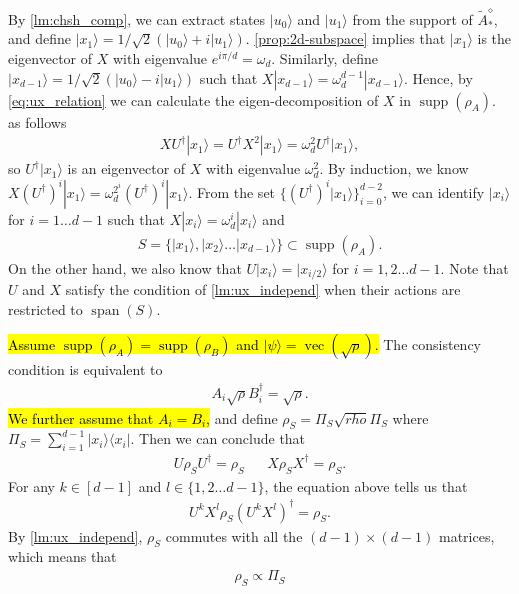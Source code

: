 \documentclass[11pt,letterpaper]{article}
\newcommand{\ket}[1]{|#1\rangle}
\newcommand{\ketbra}[2]{|#1\rangle\langle#2|}
\DeclareMathOperator{\vc}{vec}
\DeclareMathOperator{\spn}{span}
\DeclareMathOperator{\supp}{supp}
\newcommand{\1}{\mathbb{1}}
\newcommand{\tA}{\tilde{A}}
\theoremstyle{definition}
\begin{document}
By \cref{lm:chsh_comp}, we can extract states $\ket{u_0}$ and $\ket{u_1}$ from the support of $\tA_\ast^\diamond$,   
and define $\ket{x_1} = 1/\sqrt{2}(\ket{u_0} + i\ket{u_1})$. 
\cref{prop:2d-subspace} implies that $\ket{x_1}$ is the eigenvector of $X$ with eigenvalue $e^{i\pi/d} = \omega_d$.
Similarly, define $\ket{x_{d-1}} = 1/\sqrt{2}(\ket{u_0} - i\ket{u_1})$ such that $X \ket{x_{d-1}} = \omega_d^{d-1}\ket{x_{d-1}}$.
Hence, by \cref{eq:ux_relation} we can calculate the eigen-decomposition of $X$ in $\supp(\rho_A)$.
as follows
\begin{align}
\label{eq:ladder}
 XU^\dagger \ket{x_1} = U^\dagger X^2 \ket{x_1} = \omega_d^2 U^\dagger \ket{x_1},
\end{align}
so $U^\dagger \ket{x_1}$ is an eigenvector of $X$ with eigenvalue $\omega_d^2$.
By induction, we know $X (U^\dagger)^i \ket{x_1} = \omega_d^{2^i} (U^\dagger)^i\ket{x_1}$. 
From the set $\{(U^\dagger)^i \ket{x_1}\}_{i=0}^{d-2}$, we can identify $\ket{x_i}$ for $i = 1 \dots  d-1$
such that $X \ket{x_i} = \omega_d^i \ket{x_i}$ and 
\begin{align}
S = \{ \ket{x_1}, \ket{x_2} \dots  \ket{x_{d-1}} \} \subset \supp(\rho_A).
\end{align}
On the other hand, we also know that $U \ket{x_i} = \ket{x_{i/2}}$ for $i = 1,2 \dots d-1$.
Note that $U$ and $X$ satisfy the condition of \cref{lm:ux_independ} when their actions are 
restricted to $\spn(S)$.

\hl{Assume $\supp(\rho_A) = \supp(\rho_B)$ and $\ket{\psi} = \vc(\sqrt{\rho})$.} 
The consistency condition is equivalent to
\begin{align}
	A_i \sqrt{\rho} B_i^\dagger = \sqrt{\rho}.
\end{align}
\hl{We further assume that $A_i = B_i$,} and define $\rho_S = \Pi_S \sqrt{rho} \Pi_S$
where $\Pi_S = \sum_{i=1}^{d-1} \ketbra{x_i}{x_i}$. 
Then we can conclude that 
\begin{align}
	U \rho_S U^{\dagger} = \rho_S && X \rho_S X^\dagger = \rho_S.
\end{align}
For any $k \in [d-1]$ and $l \in \{1,2\dots d-1\}$, the equation above tells us that 
\begin{align}
	U^kX^l \rho_S (U^kX^l)^\dagger = \rho_S.
\end{align}
By \cref{lm:ux_independ}, $\rho_S$ commutes with all the $(d-1) \times (d-1)$ matrices, which means that 
\begin{align}
	\rho_S \propto \Pi_S
\end{align}
\end{document}
